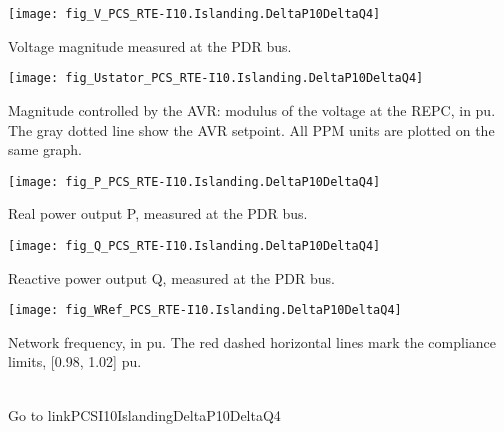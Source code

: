     \noindent
    \begin{minipage}[t]{0.48\textwidth}
        \centering
        \texttt{[image: fig\_V\_PCS\_RTE-I10.Islanding.DeltaP10DeltaQ4]}
        \begin{minipage}[t]{0.8\textwidth}
            \small Voltage magnitude measured at the PDR bus.
        \end{minipage}
    \end{minipage}
    \hfill
        \begin{minipage}[t]{0.48\textwidth}
            \centering
            \texttt{[image: fig\_Ustator\_PCS\_RTE-I10.Islanding.DeltaP10DeltaQ4]}
            \begin{minipage}[t]{0.8\textwidth}
                \small Magnitude controlled by the AVR: modulus of the voltage at the REPC, in pu.
                The gray dotted line show the AVR setpoint. All PPM units are plotted on the same
                graph.
            \end{minipage}
        \end{minipage}

    \vspace{0.5cm}

    \noindent
    \begin{minipage}[t]{0.48\textwidth}
        \centering
        \texttt{[image: fig\_P\_PCS\_RTE-I10.Islanding.DeltaP10DeltaQ4]}
        \begin{minipage}[t]{0.8\textwidth}
            \small Real power output P, measured at the PDR bus.
        \end{minipage}
    \end{minipage}
    \hfill
    \begin{minipage}[t]{0.48\textwidth}
        \centering
        \texttt{[image: fig\_Q\_PCS\_RTE-I10.Islanding.DeltaP10DeltaQ4]}
        \begin{minipage}[t]{0.8\textwidth}
            \small Reactive power output Q, measured at the PDR bus.
        \end{minipage}
    \end{minipage}

    \vspace{0.5cm}

    \begin{minipage}[t]{0.48\textwidth}
        \centering
        \texttt{[image: fig\_WRef\_PCS\_RTE-I10.Islanding.DeltaP10DeltaQ4]}
        \begin{minipage}[t]{0.8\textwidth}
            \small Network frequency, in pu. The red dashed horizontal lines mark
            the compliance limits, [0.98, 1.02] pu.
        \end{minipage}
    \end{minipage}
    \\[2\baselineskip]
    Go to  {{ linkPCSI10IslandingDeltaP10DeltaQ4 }}


